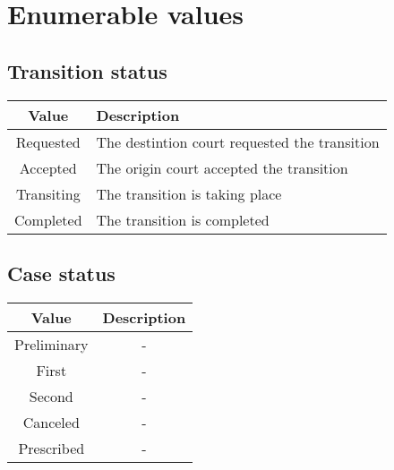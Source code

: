 \documentclass{article}
\begin{document}
\newpage
\section{Enumerable values}

\subsection{Transition status}
\begin{table}[h]
    \begin{center}
        \begin{tabular}{c|l}
            \toprule
            \textbf{Value} &
            \textbf{Description}                                           \\
            \midrule
            Requested      & The destintion court requested the transition \\
            Accepted       & The origin court accepted the transition      \\
            Transiting     & The transition is taking place                \\
            Completed      & The transition is completed                   \\
            \bottomrule
        \end{tabular}
    \end{center}
\end{table}

\subsection{Case status}
\begin{table}[h]
    \begin{center}
        \begin{tabular}{c|c}
            \toprule
            \textbf{Value} &
            \textbf{Description} \\
            \midrule
            Preliminary    & -   \\
            First          & -   \\
            Second         & -   \\
            Canceled       & -   \\
            Prescribed     & -   \\
            \bottomrule
        \end{tabular}
    \end{center}
\end{table}
\end{document}
